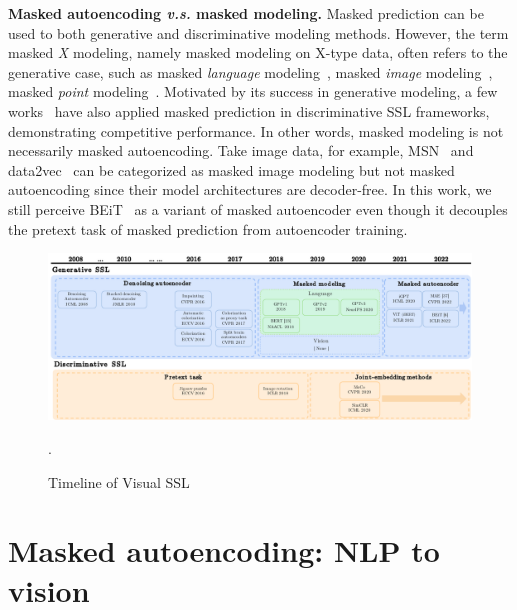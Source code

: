 \documentclass[10pt,journal,compsoc]{IEEEtran}
\begin{document}
\textbf{Masked autoencoding \textit{v.s.} masked modeling.} Masked prediction can be used to both generative and discriminative modeling methods. However, the term masked \textit{X} modeling, namely masked modeling on X-type data, often refers to the generative case, such as masked \textit{language} modeling~\cite{devlin2019bert}, masked \textit{image} modeling~\cite{xie2022simmim}, masked \textit{point} modeling~\cite{yu2022point}. Motivated by its success in generative modeling, a few works~\cite{baevski2022data2vec,assran2022masked,yi2022masked} have also applied masked prediction in discriminative SSL frameworks, demonstrating competitive performance. In other words, masked modeling is not necessarily masked autoencoding. %
Take image data, for example, MSN~\cite{assran2022masked} and data2vec~\cite{baevski2022data2vec} can be categorized as masked image modeling but not masked autoencoding since their model architectures are decoder-free. In this work, we still perceive BEiT~\cite{bao2022beit} as a variant of masked autoencoder even though it decouples the pretext task of masked prediction from autoencoder training. 




\begin{figure}[t]\centering
\includegraphics[width=1\linewidth]{fig/flow_chart_green.pdf}\\
\caption{Timeline of Visual SSL}. %
\label{fig:timeline}
\vspace{-1em}
\end{figure}


\section{Masked autoencoding: NLP to vision}
\label{sec:from_NLP}
\end{document}
